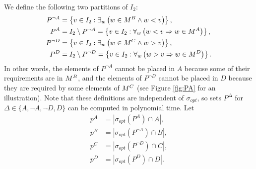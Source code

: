 \documentclass{article}
\theoremstyle{definition}
\begin{document}
We define the following two partitions of $I_2$:
\begin{align*}
P^{\neg A} &= \left\{v \in I_2: \exists_w \left(w \in M^B \wedge w < v\right)\right\},\\
P^A &= I_2 \setminus P^{\neg A} = \left\{v \in I_2: \forall_w \left(w < v \Rightarrow w \in M^A\right)\right\}, \\
P^{\neg D} &= \left\{v \in I_2: \exists_w \left(w \in M^C \wedge w > v\right)\right\},\\
P^D &= I_2 \setminus P^{\neg D} = \left\{v \in I_2: \forall_w \left(w > v \Rightarrow w \in M^D\right)\right\}.
\end{align*}
In other words, the elements of $P^{\neg A}$ cannot be placed in $A$ because some of their requirements are in $M^B$,
   and the elements of $P^{\neg D}$ cannot be placed in $D$ because they are required by some elements of $M^C$ (see Figure \ref{fig:PA} for an illustration).
 Note that these definitions are independent of $\sigma_{opt}$, so sets $P^\Delta$ for $\Delta\in \{A,\neg A,\neg D, D\}$ can be computed in polynomial time. Let 
\begin{align*}
p^A &= |\sigma_{opt}(P^A) \cap A|,\\
p^B &= |\sigma_{opt}(P^{\neg A}) \cap B|,\\
p^C &= |\sigma_{opt}(P^{\neg D}) \cap C|,\\
p^D &= |\sigma_{opt}(P^D) \cap D|.
\end{align*}
\end{document}
